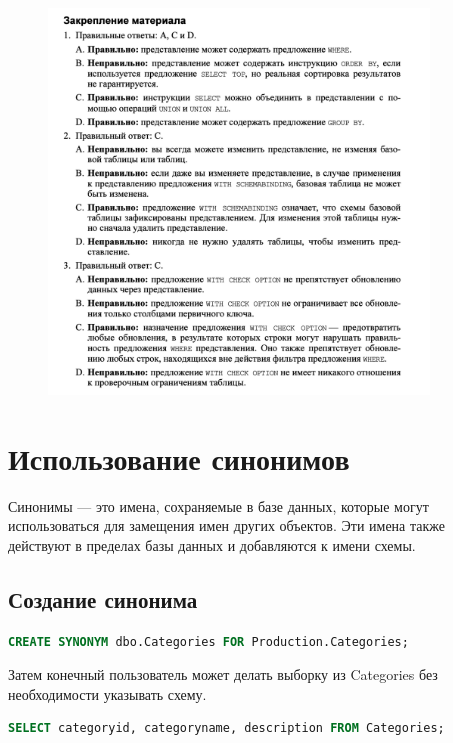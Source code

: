 \begin{figure}[h!]
	\begin{center}
		\includegraphics[width=0.9\textwidth]{img/ans19.png}
	\end{center}
	\captionsetup{justification=centering}
\end{figure}
\clearpage


\section{Использование синонимов}

Синонимы — это имена, сохраняемые в базе данных, которые могут
использоваться для замещения имен других объектов. Эти имена также действуют в пределах базы данных и добавляются к имени схемы. 


\subsection{Создание синонима}

\begin{lstlisting}[label=lst:funcReturn, language=sql]
	CREATE SYNONYM dbo.Categories FOR Production.Categories;
\end{lstlisting}	

Затем конечный пользователь может делать выборку из Categories без необходимости указывать схему. 

\begin{lstlisting}[label=lst:funcReturn, language=sql]
	SELECT categoryid, categoryname, description FROM Categories; 
\end{lstlisting}	


